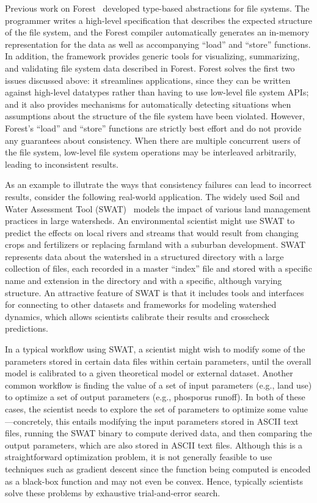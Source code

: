 %
%
Previous work on Forest~\cite{forest-icfp:fisher+} developed
type-based abstractions for file systems. The programmer writes a
high-level specification that describes the expected structure of the
file system, and the Forest compiler automatically generates an
in-memory representation for the data as well as accompanying ``load''
and ``store'' functions. In addition, the framework provides generic
tools for visualizing, summarizing, and validating file system data
described in Forest. Forest solves the first two issues discussed
above: it streamlines applications, since they can be written against
high-level datatypes rather than having to use low-level file system
APIs; and it also provides mechanisms for automatically detecting
situations when assumptions about the structure of the file system
have been violated. However, Forest's ``load'' and ``store'' functions
are strictly best effort and do not provide any guarantees about
consistency. When there are multiple concurrent users of the file
system, low-level file system operations may be interleaved
arbitrarily, leading to inconsistent results.

%
%
As an example to illutrate the ways that consistency failures can lead
to incorrect results, consider the following real-world
application. The widely used Soil and Water Assessment Tool (SWAT)~\cite{SWAT} 
models the impact of various land management practices in
large watersheds. An environmental scientist might use SWAT to predict
the effects on local rivers and streams that would result from
changing crops and fertilizers or
replacing farmland with a suburban development. SWAT represents
data about the watershed in a structured directory with a large
collection of files, each recorded in a master ``index'' file and
stored with a specific name and extension in the directory and with a
specific, although varying structure. An attractive feature of SWAT is
that it includes tools and interfaces for connecting to other datasets
and frameworks for modeling watershed dynamics, which allows
scientists calibrate their results and crosscheck predictions.

%
%
In a typical workflow using SWAT, a scientist might wish to modify
some of the parameters stored in certain data files within certain
parameters, until the overall model is calibrated to a given
theoretical model or external dataset. Another common workflow is
finding the value of a set of input parameters (e.g., land use) to
optimize a set of output parameters (e.g., phosporus runoff). In both
of these cases, the scientist needs to explore the set of parameters
to optimize some value---concretely, this entails modifying the input
parameters stored in ASCII text files, running the SWAT binary to
compute derived data, and then comparing the output parameters, which
are also stored in ASCII text files. Although this is a
straightforward optimization problem, it is not generally feasible to
use techniques such as gradient descent since the function being
computed is encoded as a black-box function and may not even be
convex. Hence, typically scientists solve these problems by exhaustive
trial-and-error search.

